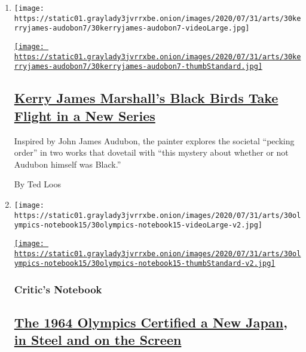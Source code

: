 \begin{enumerate}
\def\labelenumi{\arabic{enumi}.}
\item
  \texttt{[image: https://static01.graylady3jvrrxbe.onion/images/2020/07/31/arts/30kerryjames-audobon7/30kerryjames-audobon7-videoLarge.jpg]}

  \href{/2020/07/29/arts/design/kerry-james-marshall-audubon.html}{\texttt{[image: https://static01.graylady3jvrrxbe.onion/images/2020/07/31/arts/30kerryjames-audobon7/30kerryjames-audobon7-thumbStandard.jpg]}}

  \hypertarget{kerry-james-marshalls-black-birds-take-flight-in-a-new-series}{%
  \subsection{\texorpdfstring{\href{/2020/07/29/arts/design/kerry-james-marshall-audubon.html}{Kerry
  James Marshall's Black Birds Take Flight in a New
  Series}}{Kerry James Marshall's Black Birds Take Flight in a New Series}}\label{kerry-james-marshalls-black-birds-take-flight-in-a-new-series}}

  Inspired by John James Audubon, the painter explores the societal
  ``pecking order'' in two works that dovetail with ``this mystery about
  whether or not Audubon himself was Black.''

  By Ted Loos
\item
  \texttt{[image: https://static01.graylady3jvrrxbe.onion/images/2020/07/31/arts/30olympics-notebook15/30olympics-notebook15-videoLarge-v2.jpg]}

  \href{/2020/07/30/arts/design/tokyo-olympics-1964-design.html}{\texttt{[image: https://static01.graylady3jvrrxbe.onion/images/2020/07/31/arts/30olympics-notebook15/30olympics-notebook15-thumbStandard-v2.jpg]}}

  \hypertarget{critics-notebook}{%
  \subsubsection{Critic's Notebook}\label{critics-notebook}}

  \hypertarget{the-1964-olympics-certified-a-new-japan-in-steel-and-on-the-screen}{%
  \subsection{\texorpdfstring{\href{/2020/07/30/arts/design/tokyo-olympics-1964-design.html}{The
  1964 Olympics Certified a New Japan, in Steel and on the
  Screen}}{The 1964 Olympics Certified a New Japan, in Steel and on the Screen}}\label{the-1964-olympics-certified-a-new-japan-in-steel-and-on-the-screen}}


\end{enumerate}
